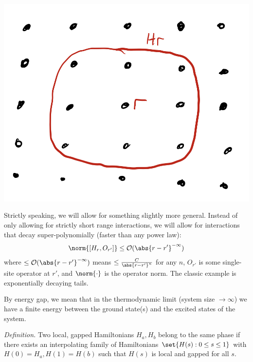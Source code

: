 \begin{center}
    \includegraphics[scale=0.35]{Lectures/Images/lec11-localH.png}
\end{center}

Strictly speaking, we will allow for something slightly more general. Instead of only allowing for strictly short range interactions, we will allow for interactions that decay super-polynomially (faster than any power law):
\begin{equation}
    \norm{[H_r, O_{r'}]} \leq \mathcal{O}(\abs{r - r'}^{-\infty})
\end{equation}
where $\leq \mathcal{O}(\abs{r - r'}^{-\infty})$ means $\leq \frac{C}{\abs{r - r'}^n}$ for any $n$, $O_{r'}$ is some single-site operator at $r'$, and $\norm{\cdot}$ is the operator norm. The classic example is exponentially decaying tails.

By energy gap, we mean that in the thermodynamic limit (system size $\to \infty$) we have a finite energy between the ground state(s) and the excited states of the system.

\textit{Definition.} Two local, gapped Hamiltonians $H_a, H_b$ belong to the same phase if there exists an interpolating family of Hamiltonians $\set{H(s): 0 \leq s \leq 1}$ with $H(0) = H_a, H(1) = H(b)$ such that $H(s)$ is local and gapped for all $s$.


